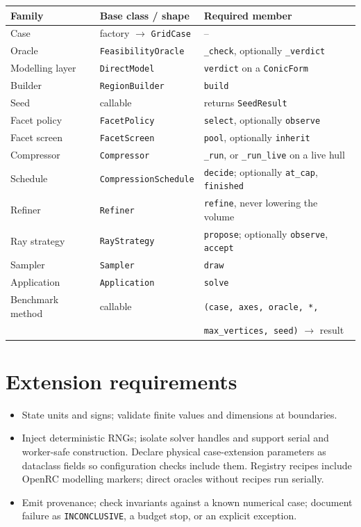 \documentclass[11pt,a4paper]{report}
\newcommand{\code}[1]{\texttt{\small #1}}
\begin{document}
\begin{center}\small
\begin{tabular}{@{}lll@{}}
\toprule
Family & Base class / shape & Required member \\
\midrule
Case         & factory $\rightarrow$ \code{GridCase} & -- \\
Oracle       & \code{FeasibilityOracle}   & \code{\_check}, optionally \code{\_verdict} \\
Modelling layer & \code{DirectModel}     & \code{verdict} on a \code{ConicForm} \\
Builder      & \code{RegionBuilder}       & \code{build} \\
Seed         & callable                   & returns \code{SeedResult} \\
Facet policy & \code{FacetPolicy}         & \code{select}, optionally \code{observe} \\
Facet screen & \code{FacetScreen}         & \code{pool}, optionally \code{inherit} \\
Compressor   & \code{Compressor}          & \code{\_run}, or \code{\_run\_live} on a live hull \\
Schedule     & \code{CompressionSchedule} & \code{decide}; optionally \code{at\_cap}, \code{finished} \\
Refiner      & \code{Refiner}             & \code{refine}, never lowering the volume \\
Ray strategy & \code{RayStrategy}         & \code{propose}; optionally \code{observe}, \code{accept} \\
Sampler      & \code{Sampler}             & \code{draw} \\
Application  & \code{Application}         & \code{solve} \\
Benchmark method & callable               & \code{(case, axes, oracle, *,} \\
             &                            & \quad\code{max\_vertices, seed)} $\rightarrow$ result \\
\bottomrule
\end{tabular}
\end{center}

\section{Extension requirements}

\begin{itemize}
\item State units and signs; validate finite values and dimensions at boundaries.
\item Inject deterministic RNGs; isolate solver handles and support serial and
  worker-safe construction. Declare physical case-extension parameters as
  dataclass fields so configuration checks include them. Registry recipes
  include OpenRC modelling markers; direct oracles without recipes run serially.
\item Emit provenance; check invariants against a known numerical case; document
  failure as \code{INCONCLUSIVE}, a budget stop, or an explicit exception.
\end{itemize}
\end{document}
